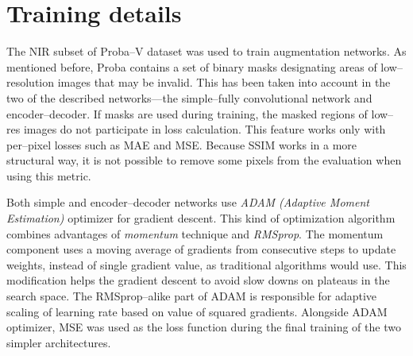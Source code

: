 \section{Training details}
The NIR subset of Proba--V dataset was used to train augmentation networks.
As mentioned before, Proba contains a set of binary masks designating areas of low--resolution images that may be invalid.
This has been taken into account in the two of the described networks---the simple--fully convolutional network and encoder--decoder.
If masks are used during training, the masked regions of low--res images do not participate in loss calculation.
This feature works only with per--pixel losses such as MAE and MSE.
Because SSIM works in a more structural way, it is not possible to remove some pixels from the evaluation when using this metric.

Both simple and encoder--decoder networks use \textit{ADAM (Adaptive Moment Estimation)} optimizer for gradient descent.
This kind of optimization algorithm combines advantages of \textit{momentum} technique and \textit{RMSprop}.
The momentum component uses a moving average of gradients from consecutive steps to update weights, instead of single gradient value, as traditional algorithms would use.
This modification helps the gradient descent to avoid slow downs on plateaus in the search space.
The RMSprop--alike part of ADAM is responsible for adaptive scaling of learning rate based on value of squared gradients.
Alongside ADAM optimizer, MSE was used as the loss function during the final training of the two simpler architectures.

